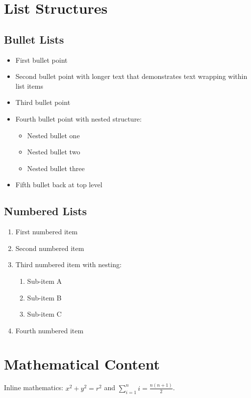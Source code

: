 \documentclass{article}
\begin{document}
\section{List Structures}

\subsection{Bullet Lists}

\begin{itemize}
\item First bullet point
\item Second bullet point with longer text that demonstrates text wrapping within list items
\item Third bullet point
\item Fourth bullet point with nested structure:
  \begin{itemize}
  \item Nested bullet one
  \item Nested bullet two
  \item Nested bullet three
  \end{itemize}
\item Fifth bullet back at top level
\end{itemize}

\subsection{Numbered Lists}

\begin{enumerate}
\item First numbered item
\item Second numbered item
\item Third numbered item with nesting:
  \begin{enumerate}
  \item Sub-item A
  \item Sub-item B
  \item Sub-item C
  \end{enumerate}
\item Fourth numbered item
\end{enumerate}

\section{Mathematical Content}

Inline mathematics: $x^2 + y^2 = r^2$ and $\sum_{i=1}^n i = \frac{n(n+1)}{2}$.
\end{document}
